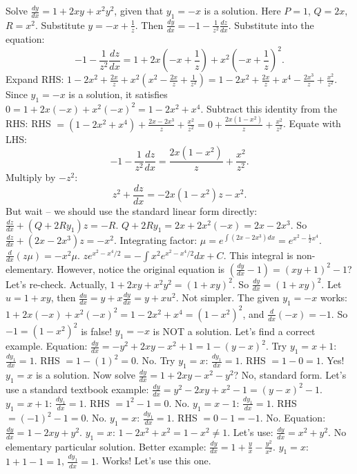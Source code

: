 \documentclass[11pt]{article}
\begin{document}
\begin{exoresolu}
Solve $\frac{dy}{dx} = 1 + 2xy + x^2 y^2$, given that $y_1 = -x$ is a solution.
\tcblower
Here $P=1$, $Q=2x$, $R=x^2$. Substitute $y = -x + \frac{1}{z}$.
Then $\frac{dy}{dx} = -1 - \frac{1}{z^2}\frac{dz}{dx}$.
Substitute into the equation:
\[ -1 - \frac{1}{z^2}\frac{dz}{dx} = 1 + 2x\left(-x + \frac{1}{z}\right) + x^2\left(-x + \frac{1}{z}\right)^2. \]
Expand RHS:
$1 - 2x^2 + \frac{2x}{z} + x^2(x^2 - \frac{2x}{z} + \frac{1}{z^2}) = 1 - 2x^2 + \frac{2x}{z} + x^4 - \frac{2x^3}{z} + \frac{x^2}{z^2}$.
Since $y_1=-x$ is a solution, it satisfies $0 = 1 + 2x(-x) + x^2(-x)^2 = 1 - 2x^2 + x^4$.
Subtract this identity from the RHS:
RHS $= (1 - 2x^2 + x^4) + \frac{2x - 2x^3}{z} + \frac{x^2}{z^2} = 0 + \frac{2x(1-x^2)}{z} + \frac{x^2}{z^2}$.
Equate with LHS:
\[ -1 - \frac{1}{z^2}\frac{dz}{dx} = \frac{2x(1-x^2)}{z} + \frac{x^2}{z^2}. \]
Multiply by $-z^2$:
\[ z^2 + \frac{dz}{dx} = -2x(1-x^2)z - x^2. \]
But wait -- we should use the standard linear form directly:
$\frac{dz}{dx} + (Q + 2Ry_1)z = -R$.
$Q + 2Ry_1 = 2x + 2x^2(-x) = 2x - 2x^3$.
So $\frac{dz}{dx} + (2x - 2x^3)z = -x^2$.
Integrating factor: $\mu = e^{\int (2x-2x^3)dx} = e^{x^2 - \frac{1}{2}x^4}$.
$\frac{d}{dx}(z\mu) = -x^2 \mu$.
$z e^{x^2 - x^4/2} = -\int x^2 e^{x^2 - x^4/2} dx + C$.
This integral is non-elementary. However, notice the original equation is $(\frac{dy}{dx} - 1) = (x y + 1)^2 - 1$? Let's re-check.
Actually, $1 + 2xy + x^2y^2 = (1+xy)^2$. So $\frac{dy}{dx} = (1+xy)^2$.
Let $u = 1+xy$, then $\frac{du}{dx} = y + x\frac{dy}{dx} = y + x u^2$.
Not simpler. The given $y_1=-x$ works: $1+2x(-x)+x^2(-x)^2 = 1-2x^2+x^4 = (1-x^2)^2$, and $\frac{d}{dx}(-x) = -1$. So $-1 = (1-x^2)^2$ is false! $y_1=-x$ is NOT a solution.
Let's find a correct example.
Equation: $\frac{dy}{dx} = -y^2 + 2xy - x^2 + 1 = 1 - (y-x)^2$.
Try $y_1 = x+1$: $\frac{dy_1}{dx}=1$. RHS $= 1 - (1)^2 = 0$. No.
Try $y_1 = x$: $\frac{dy_1}{dx}=1$. RHS $= 1 - 0 = 1$. Yes! $y_1=x$ is a solution.
Now solve $\frac{dy}{dx} = 1 + 2xy - x^2 - y^2$? No, standard form.
Let's use a standard textbook example: $\frac{dy}{dx} = y^2 - 2xy + x^2 - 1 = (y-x)^2 - 1$.
$y_1 = x+1$: $\frac{dy_1}{dx}=1$. RHS $= 1^2 - 1 = 0$. No.
$y_1 = x-1$: $\frac{dy_1}{dx}=1$. RHS $= (-1)^2 - 1 = 0$. No.
$y_1 = x$: $\frac{dy_1}{dx}=1$. RHS $= 0 - 1 = -1$. No.
Equation: $\frac{dy}{dx} = 1 - 2xy + y^2$. $y_1=x$: $1-2x^2+x^2=1-x^2 \neq 1$.
Let's use: $\frac{dy}{dx} = x^2 + y^2$. No elementary particular solution.
Better example: $\frac{dy}{dx} = 1 + \frac{y}{x} - \frac{y^2}{x^2}$. $y_1=x$: $1+1-1=1$, $\frac{dy_1}{dx}=1$. Works!
Let's use this one.
\end{exoresolu}
\end{document}
